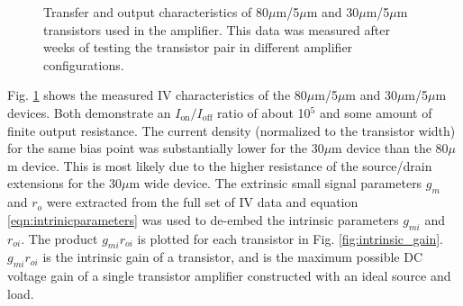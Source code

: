 \documentclass[conference]{IEEEtran}
\begin{document}
\begin{figure}[htbp]
    \quad
    \caption{Transfer and output characteristics of 80$\mu$m/5$\mu$m and 30$\mu$m/5$\mu$m transistors used in the amplifier. This data was measured after weeks of testing the transistor pair in different amplifier configurations.}
    \label{fig:ivcharacteristics}
\end{figure}

Fig. \ref{fig:ivcharacteristics} shows the measured IV characteristics of the 80$\mu$m/5$\mu$m and 30$\mu$m/5$\mu$m devices.
Both demonstrate an $I_{\text{on}}/I_{\text{off}}$ ratio of about 10$^5$ and some amount of finite output resistance.
The current density (normalized to the transistor width) for the same bias point was substantially lower for the 30$\mu$m device than the 80$\mu$m device.
This is most likely due to the higher resistance of the source/drain extensions for the 30$\mu$m wide device.
The extrinsic small signal parameters $g_{m}$ and $r_{o}$ were extracted from the full set of IV data and equation \ref{eqn:intrinicparameters} was used to de-embed the intrinsic parameters $g_{mi}$ and $r_{oi}$.
The product $g_{mi}r_{oi}$ is plotted for each transistor in Fig. \ref{fig:intrinsic_gain}. $g_{mi}r_{oi}$ is the intrinsic gain of a transistor, and is the maximum possible DC voltage gain of a single transistor amplifier constructed with an ideal source and load.

\end{document}
